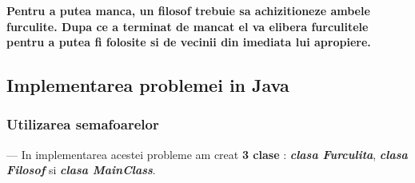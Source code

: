 \documentclass[14pt]{article}
\begin{document}
 \vspace{4 mm}

\textbf{Pentru a putea manca, un filosof trebuie sa achizitioneze ambele furculite. Dupa ce a terminat de mancat el va elibera furculitele pentru a putea fi folosite si de vecinii din imediata lui apropiere.}

 \vspace{3 mm}

\subsection{Implementarea problemei in Java}

 \vspace{3 mm}

\subsubsection{\textbf{Utilizarea semafoarelor}}

\vspace{2 mm}

--- In implementarea acestei probleme am creat \textbf{3 clase} :\textbf{\textit{ clasa Furculita}}, \textbf{\textit{clasa Filosof}} si \textbf{\textit{clasa MainClass}}.
\end{document}
